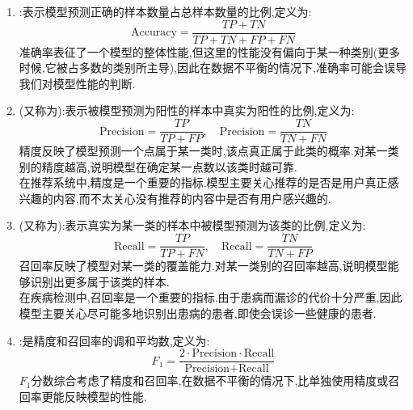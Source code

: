 \documentclass{ctexart}
\begin{document}
\begin{definition}[基于混淆矩阵的评价指标]
    \begin{enumerate}[label=\tbf{\arabic*.},topsep=0pt,parsep=0pt,itemsep=0pt,partopsep=0pt]
        \item {}:表示模型预测正确的样本数量占总样本数量的比例,定义为:
        \[\text{Accuracy}=\dfrac{TP+TN}{TP+TN+FP+FN}\]
        准确率表征了一个模型的整体性能,但这里的性能没有偏向于某一种类别(更多时候,它被占多数的类别所主导),因此在数据不平衡的情况下,准确率可能会误导我们对模型性能的判断.
        \item {}(又称为):表示被模型预测为阳性的样本中真实为阳性的比例,定义为:
        \[\text{Precision}=\dfrac{TP}{TP+FP},\quad\text{Precision}=\dfrac{TN}{TN+FN}\]
        精度反映了模型预测一个点属于某一类时,该点真正属于此类的概率.对某一类别的精度越高,说明模型在确定某一点数以该类时越可靠.\\
        \indent 在推荐系统中,精度是一个重要的指标.模型主要关心推荐的是否是用户真正感兴趣的内容,而不太关心没有推荐的内容中是否有用户感兴趣的.
        \item {}(又称为):表示真实为某一类的样本中被模型预测为该类的比例,定义为:
        \[\text{Recall}=\dfrac{TP}{TP+FN},\quad\text{Recall}=\dfrac{TN}{TN+FP}\]
        召回率反映了模型对某一类的覆盖能力.对某一类别的召回率越高,说明模型能够识别出更多属于该类的样本.\\
        \indent 在疾病检测中,召回率是一个重要的指标.由于患病而漏诊的代价十分严重,因此模型主要关心尽可能多地识别出患病的患者,即使会误诊一些健康的患者.
        \item {}:是精度和召回率的调和平均数,定义为:
        \[F_1=\dfrac{2\cdot\text{Precision}\cdot\text{Recall}}{\text{Precision}+\text{Recall}}\]
        $F_1$分数综合考虑了精度和召回率,在数据不平衡的情况下,比单独使用精度或召回率更能反映模型的性能.
    \end{enumerate}
\end{definition}
\end{document}
